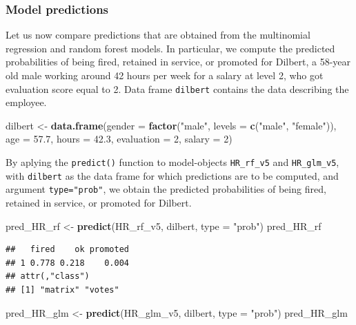 \documentclass[12pt,]{krantz}
\newenvironment{Shaded}{\begin{snugshade}}{\end{snugshade}}
\newcommand{\DataTypeTok}[1]{\textcolor[rgb]{0.13,0.29,0.53}{#1}}
\newcommand{\DecValTok}[1]{\textcolor[rgb]{0.00,0.00,0.81}{#1}}
\newcommand{\FloatTok}[1]{\textcolor[rgb]{0.00,0.00,0.81}{#1}}
\newcommand{\KeywordTok}[1]{\textcolor[rgb]{0.13,0.29,0.53}{\textbf{#1}}}
\newcommand{\NormalTok}[1]{#1}
\newcommand{\StringTok}[1]{\textcolor[rgb]{0.31,0.60,0.02}{#1}}
\begin{document}
\hypertarget{predictionsHR}{%
\subsubsection{Model predictions}\label{predictionsHR}}

Let us now compare predictions that are obtained from the multinomial regression and random forest models. In particular, we compute the predicted probabilities of being fired, retained in service, or promoted for Dilbert, a 58-year old male working around 42 hours per week for a salary at level 2, who got evaluation score equal to 2. Data frame \texttt{dilbert} contains the data describing the employee.

\begin{Shaded}
\begin{Highlighting}[]
\NormalTok{dilbert <-}\StringTok{ }\KeywordTok{data.frame}\NormalTok{(}\DataTypeTok{gender =} \KeywordTok{factor}\NormalTok{(}\StringTok{"male"}\NormalTok{, }\DataTypeTok{levels =} \KeywordTok{c}\NormalTok{(}\StringTok{"male"}\NormalTok{, }\StringTok{"female"}\NormalTok{)),}
                \DataTypeTok{age =} \FloatTok{57.7}\NormalTok{,}
                \DataTypeTok{hours =} \FloatTok{42.3}\NormalTok{,}
                \DataTypeTok{evaluation =} \DecValTok{2}\NormalTok{,}
                \DataTypeTok{salary =} \DecValTok{2}\NormalTok{)}
\end{Highlighting}
\end{Shaded}

By aplying the \texttt{predict()} function to model-objects \texttt{HR\_rf\_v5} and \texttt{HR\_glm\_v5}, with \texttt{dilbert} as the data frame for which predictions are to be computed, and argument \texttt{type="prob"}, we obtain the predicted probabilities of being fired, retained in service, or promoted for Dilbert.

\begin{Shaded}
\begin{Highlighting}[]
\NormalTok{pred_HR_rf <-}\StringTok{ }\KeywordTok{predict}\NormalTok{(HR_rf_v5, dilbert, }\DataTypeTok{type =} \StringTok{"prob"}\NormalTok{)}
\NormalTok{pred_HR_rf}
\end{Highlighting}
\end{Shaded}

\begin{verbatim}
##   fired    ok promoted
## 1 0.778 0.218    0.004
## attr(,"class")
## [1] "matrix" "votes"
\end{verbatim}

\begin{Shaded}
\begin{Highlighting}[]
\NormalTok{pred_HR_glm <-}\StringTok{ }\KeywordTok{predict}\NormalTok{(HR_glm_v5, dilbert, }\DataTypeTok{type =} \StringTok{"prob"}\NormalTok{)}
\NormalTok{pred_HR_glm}
\end{Highlighting}
\end{Shaded}
\end{document}
